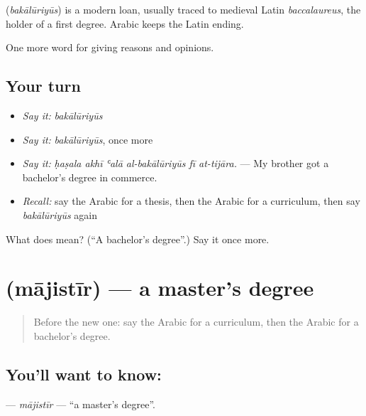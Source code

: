 \begin{cousinweb}
\textbf{} (\emph{bakālūriyūs}) is a modern loan, usually traced to medieval Latin \emph{baccalaureus}, the holder of a first degree. Arabic keeps the Latin ending.
\end{cousinweb}

\begin{grammarlens}[title={What you've built}]
One more word for giving reasons and opinions.
\end{grammarlens}

\subsection*{Your turn}
\begin{itemize}
\raggedright
  \item \emph{Say it:} \emph{bakālūriyūs}
  \item \emph{Say it:} \emph{bakālūriyūs}, once more
  \item \emph{Say it:} \emph{ḥaṣala akhī ʿalā al-bakālūriyūs fī at-tijāra.} — My brother got a bachelor's degree in commerce.
  \item \emph{Recall:} say the Arabic for a thesis, then the Arabic for a curriculum, then say \emph{bakālūriyūs} again
\end{itemize}

\begin{tcolorbox}[breakable,colback=teal!4,colframe=teal!35!black,title={Before you move on}]
What does  mean? (\textquotedblleft{}A bachelor's degree\textquotedblright{}.) Say it once more.
\end{tcolorbox}
\section[\texorpdfstring{\ar{ماجستير} (mājistīr)}{ماجستير (mājistīr)}]{ (mājistīr) — a master's degree}

\label{lesson:AR-C397-majistir}



\begin{quote}
Before the new one: say the Arabic for a curriculum, then the Arabic for a bachelor's degree.
\end{quote}

\subsection*{You'll want to know: }
\textbf{} — \emph{mājistīr} — \textquotedblleft{}a master's degree\textquotedblright{}.

